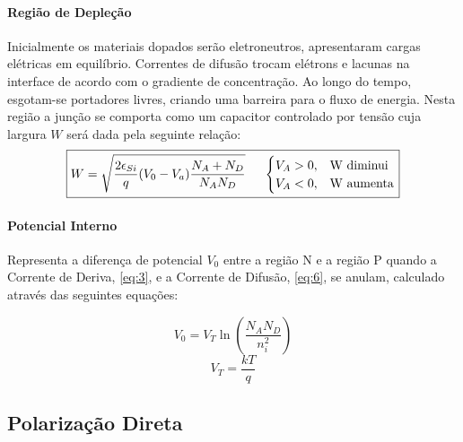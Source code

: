 \documentclass{article}
\begin{document}
        \paragraph{Região de Depleção}Inicialmente os materiais dopados serão eletroneutros, apresentaram cargas elétricas em equilíbrio. Correntes de difusão trocam elétrons e lacunas na interface de acordo com o gradiente de concentração. Ao longo do tempo, esgotam-se portadores livres, criando uma barreira para o fluxo de energia. Nesta região a junção se comporta como um capacitor controlado por tensão cuja largura $W$ será dada pela seguinte relação:
            \begin{equation}
                \boxed{
                    W = \sqrt{\frac{2\epsilon_{Si}}{q} (V_{0} - V_{a}) \frac{N_{A} + N_{D}}{N_{A} N_{D}}}
                    \hspace{5mm}
                    \begin{cases}
                        V_{A} > 0, & \text{W diminui}\\
                        V_{A} < 0, & \text{W aumenta}
                    \end{cases}
                }
            \end{equation}

        \paragraph{Potencial Interno}Representa a diferença de potencial $V_{0}$ entre a região N e a região P quando a Corrente de Deriva, \eqref{eq:3}, e a Corrente de Difusão, \eqref{eq:6}, se anulam, calculado através das seguintes equações:
            \begin{multicols}{2}
                \begin{equation}
                    \boxed{
                        V_{0} = V_{T} \ln\left(\frac{N_{A}N_{D}}{n_{i}^{2}}\right)
                    }
                \end{equation}
                \begin{equation}
                    \boxed{
                        V_{T} = \frac{kT}{q}
                    }
                \end{equation}
            \end{multicols}


        \subsection{Polarização Direta}
\end{document}
